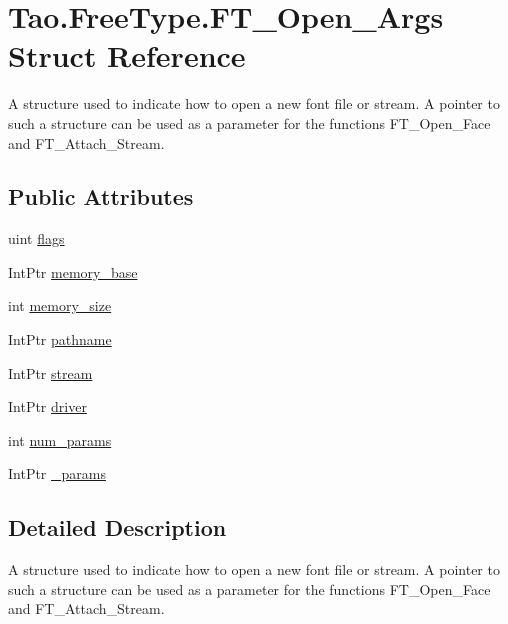 \hypertarget{struct_tao_1_1_free_type_1_1_f_t___open___args}{
\section{Tao.FreeType.FT\_\-Open\_\-Args Struct Reference}
\label{struct_tao_1_1_free_type_1_1_f_t___open___args}
}


A structure used to indicate how to open a new font file or stream. A pointer to such a structure can be used as a parameter for the functions FT\_\-Open\_\-Face and FT\_\-Attach\_\-Stream.  


\subsection*{Public Attributes}
\begin{DoxyCompactItemize}
\item 
uint \hyperlink{struct_tao_1_1_free_type_1_1_f_t___open___args_a117a76e42bf77d65e0d733342c4d28f1}{flags}
\item 
IntPtr \hyperlink{struct_tao_1_1_free_type_1_1_f_t___open___args_aafdbf467b031c162f7a0a8fd4f031f66}{memory\_\-base}
\item 
int \hyperlink{struct_tao_1_1_free_type_1_1_f_t___open___args_a2ad2c8ade3a312828754a9fccb93e2ac}{memory\_\-size}
\item 
IntPtr \hyperlink{struct_tao_1_1_free_type_1_1_f_t___open___args_ad80d3dbe0301daf05ad1c81d97560d6b}{pathname}
\item 
IntPtr \hyperlink{struct_tao_1_1_free_type_1_1_f_t___open___args_a9afc3822bc375ee541f4bcfd1b4bec52}{stream}
\item 
IntPtr \hyperlink{struct_tao_1_1_free_type_1_1_f_t___open___args_a78291b00524de7112b5ac41eb92a214b}{driver}
\item 
int \hyperlink{struct_tao_1_1_free_type_1_1_f_t___open___args_a7c5a535b09dbf49db1abff2dfc435f09}{num\_\-params}
\item 
IntPtr \hyperlink{struct_tao_1_1_free_type_1_1_f_t___open___args_a4dd8817cbe072ecc2eee30762fa72870}{\_\-params}
\end{DoxyCompactItemize}


\subsection{Detailed Description}
A structure used to indicate how to open a new font file or stream. A pointer to such a structure can be used as a parameter for the functions FT\_\-Open\_\-Face and FT\_\-Attach\_\-Stream. 


